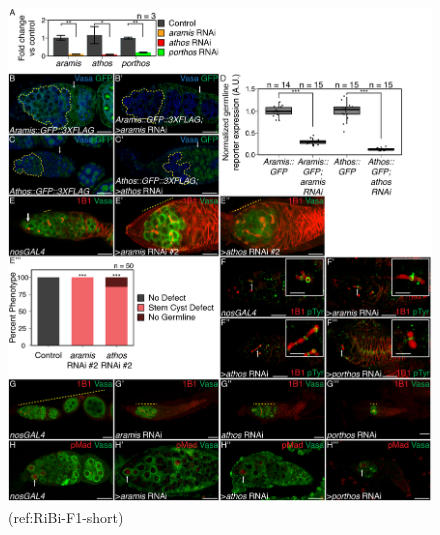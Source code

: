 \documentclass[12pt,oneside]{reedthesis}
\begin{document}
\begin{figure}

{\centering \includegraphics[width=6.5 in,height=8.9375 in]{./figure/Ribosome Biogenesis/Ribosome Biogenesis 1S} 

}

\caption[(ref:RiBi-F1-short)]{(ref:RiBi-F1-short)}\label{fig:unnamed-chunk-7}
\end{figure}
\end{document}
